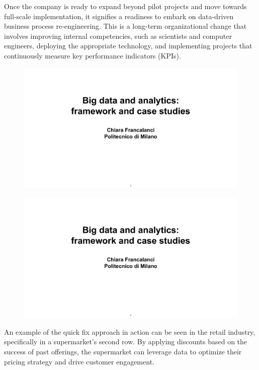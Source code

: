 Once the company is ready to expand beyond pilot projects and move
towards full-scale implementation, it signifies a readiness to embark on
data-driven business process re-engineering. This is a long-term
organizational change that involves improving internal competencies,
such as scientists and computer engineers, deploying the appropriate
technology, and implementing projects that continuously measure key
performance indicators (KPIs).

\begin{figure}[!h]
    \centering
    \includegraphics[page=64, trim = 2cm 4cm 2.5cm 6cm, clip, width=\textwidth]{images/06 - BIG_DATA.pdf}
\end{figure}

\begin{figure}[!h]
    \centering
    \includegraphics[page=65, trim = 2cm 1.5cm 1.5cm 5.5cm, clip, width=\textwidth]{images/06 - BIG_DATA.pdf}
\end{figure}

An example of the quick fix approach in action can be seen in the retail
industry, specifically in a supermarket's second row. By applying
discounts based on the success of past offerings, the supermarket can
leverage data to optimize their pricing strategy and drive customer
engagement.

